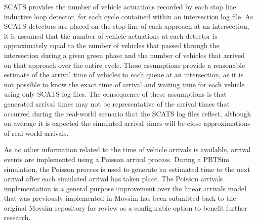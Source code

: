 SCATS provides the number of vehicle actuations recorded by each stop line inductive loop detector, for each cycle contained within an intersection log file. As SCATS detectors are placed on the stop line of each approach at an intersection, it is assumed that the number of vehicle actuations at each detector is approximately equal to the number of vehicles that passed through the intersection during a given green phase and the number of vehicles that arrived on that approach over the entire cycle. These assumptions provide a reasonable estimate of the arrival time of vehicles to each queue at an intersection, as it is not possible to know the exact time of arrival and waiting time for each vehicle using only SCATS log files. The consequence of these assumptions is that generated arrival times may not be representative of the arrival times that occurred during the real-world scenario that the SCATS log files reflect, although on average it is expected the simulated arrival times will be close approximations of real-world arrivals. 

As no other information related to the time of vehicle arrivals is available, arrival events are implemented using a Poisson arrival process. During a PBTSim simulation, the Poisson process is used to generate an estimated time to the next arrival after each simulated arrival has taken place. The Poisson arrivals implementation is a general purpose improvement over the linear arrivals model that was previously implemented in Movsim has been submitted back to the original Movsim repository for review as a configurable option to benefit further research.

